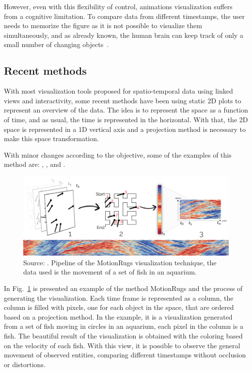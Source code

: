 However, even with this flexibility of control, animations visualization suffers from a cognitive limitation.
%
To compare data from different timestamps, the user needs to memorize the figure as it is not possible to visualize them simultaneously, and as already known, the human brain can keep track of only a small number of changing objects~\cite{Harrower:2007:Cognitive}. 
%
\subsection{Recent methods}
%
With most visualization tools proposed for spatio-temporal data using linked views and interactivity, some recent methods have been using static 2D plots to represent an overview of the data.
%
The idea is to represent the space as a function of time, and as usual, the time is represented in the horizontal.
%
With that, the 2D space is represented in a 1D vertical axis and a projection method is necessary to make this space transformation.

With minor changes according to the objective, some of the examples of this method are: \cite{Buchmuller:2018:MVCTST}, \cite{spatialrugs}, \cite{wulms2021stable} and \cite{1dordering}.

\begin{figure}
    \centering
    \includegraphics[width = \textwidth]{src/imgs/motionrugs.png}
    \caption{Source: \cite{Buchmuller:2018:MVCTST}. Pipeline of the MotionRugs visualization technique, the data used is the movement of a set of fish in an aquarium.}
    \label{fig:motionrugs}
\end{figure}

In Fig.~\ref{fig:motionrugs} is presented an example of the method MotionRugs and the process of generating the visualization.
%
Each time frame is represented as a column, the column is filled with pixels, one for each object in the space, that are ordered based on a projection method.
%
In the example, it is a visualization generated from a set of fish moving in circles in an aquarium, each pixel in the column is a fish. 
%
The beautiful result of the visualization is obtained with the coloring based on the velocity of each fish.
%
With this view, it is possible to observe the general movement of observed entities, comparing different timestamps without occlusion or distortions.

